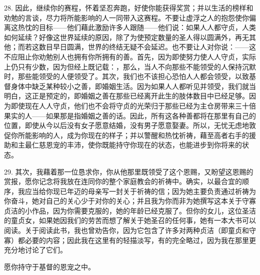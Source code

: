 28. 因此，继续你的赛程，怀着坚忍奔跑，好使你能获得奖赏；并以生活的榜样和劝勉的言谈，尽力将所能影响的人一同带入这赛程。不要让虚浮之人的抱怨使你偏离这热忱的目标——他们藉此激励许多人跟随——他们说：如果人人都守贞，人类如何延续？好像这世界延续的原因，除了为使预定数量的圣人得以圆满外，再无其他；而若这数目早日圆满，世界的终结无疑不会延迟。也不要让人对你说：——这不应阻止你劝勉别人也拥有你所拥有的善。首先，因为即使努力使人人守贞，实际上仍只有少数，因为但经上既记载：，那么，当人不向那些不能领受的人保持沉默时，那些能领受的人便领受了。其次，我们也不该担心恐怕人人都会领受，以致基督身体中缺乏某种较小之善，即婚姻生活。因为如果人人都听见并领受，我们就当明白，这正是预定的，即婚姻之善在那些已经离开此生的肢体数目中已经足够。因为即使现在人人守贞，他们也不会将守贞的光荣归于那些已经为主仓房带来三十倍果实的人——如果那是指婚姻之善的话。因此，所有这各种善都将在那里有自己的位置，即使从今以后没有女子愿意结婚，没有男子愿意娶妻。所以，无忧无虑地敦促你所能影响的人，成为你现在的样子；并以警醒和热忱祈祷，藉至高者右手的援助和主最仁慈恩宠的丰沛，使你既能持守你现在的状态，也能进步到你将来的状态。\par

29. 其次，我藉着那一位恳求你，你从他那里既领受了这个恩赐，又盼望这恩赐的赏报，愿你记念将我放在连同你的整个家庭教会的祈祷中。确实，以最合宜的顺序，我应当给你现已年迈的母亲写一封关于祈祷的信；因为她主要负责通过祈祷为你奋斗，她对自己的关心少于对你的关心；并且我为你而非为她撰写这本关于守寡贞洁的小作品，因为你需要克服的，她的年龄已经克服了。但你的女儿，这位圣洁的童贞女，如果她因我们的劳苦而想了解关于她圣召的任何事，她有一本大书可以阅读。关于阅读此书，我也曾劝告你，因为它包含了许多对两种贞洁（即童贞和守寡）都必要的内容；因此我在这里有的轻描淡写，有的完全略过，因为我在那里更充分地讨论了它们。\par

愿你持守于基督的恩宠之中。\par

